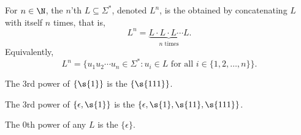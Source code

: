 \begin{flex}
\begin{definition} \label{definition:Powers-of-a-language}
For $n \in \N$, the $n$'th  $L \subseteq \Sigma^*$, denoted $L^n$, is the  obtained by concatenating $L$ with itself $n$ times, that is,
\[
    L^n = \underbrace{L \cdot L \cdot L \cdots L}_{n \text{ times}}.
\]
Equivalently, 
\[
    L^n = \{u_1u_2\cdots u_n \in \Sigma^* : u_i \in L \text{ for all } i \in \{1,2,\ldots,n\}\}.
\] 
\end{definition}

\begin{example}[$\{1\}^3$] \label{example:13}
The 3rd power of $\{\s{1}\}$ is the  $\{\s{111}\}$.
\end{example}

\begin{example}[$\{\epsilon, 1\}^3$] \label{example:epsilon-13}
The 3rd power of $\{\epsilon, \s{1}\}$ is the  $\{\epsilon, \s{1}, \s{11}, \s{111}\}$.
\end{example}

\begin{example}[$L^0$] \label{example:L0}
The 0th power of any  $L$ is the  $\{\epsilon\}$.
\end{example}
\end{flex}



